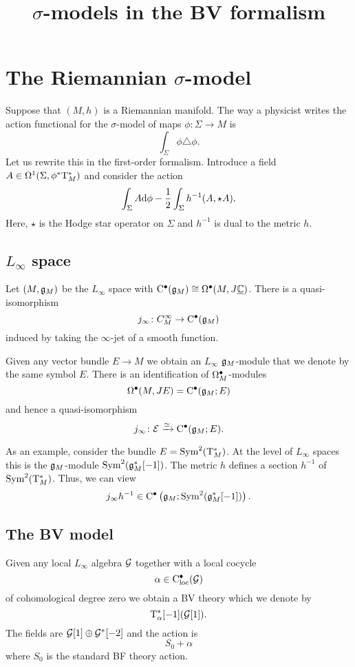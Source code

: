 \documentclass[11pt]{amsart}
\begin{document}
\title{$\sigma$-models in the BV formalism}
\maketitle

\section{The Riemannian $\sigma$-model} 

Suppose that $(M,h)$ is a Riemannian manifold. 
The way a physicist writes the action functional for the $\sigma$-model of maps $\phi \colon \Sigma \to M$ is
\[
\int_{\Sigma}  \phi \triangle \phi .
\]
Let us rewrite this in the first-order formalism. 
Introduce a field $A \in \Omega^1(\Sigma, \phi^* {\rm T}_M^*)$ and consider the action
\[
\int_{\Sigma} A {\rm d} \phi - \frac12 \int_\Sigma h^{-1} (A, \star A).
\]
Here, $\star$ is the Hodge star operator on $\Sigma$ and $h^{-1}$ is dual to the metric $h$.

\subsection{$L_\infty$ space}

Let $(M, \mathfrak g_M)$ be the $L_\infty$ space with ${\rm C}^\bullet(\mathfrak g_M) \cong \Omega^\bullet(M, J \smash{\underline{\mathbb C}})$. 
There is a quasi-isomorphism
\[
j_\infty \colon C^\infty_M \to {\rm C}^\bullet(\mathfrak g_M) 
\]
induced by taking the $\infty$-jet of a smooth function. 

Given any vector bundle $E \to M$ we obtain an $L_\infty$ $\mathfrak g_M$-module that we denote by the same symbol $E$. 
There is an identification of $\Omega^\bullet_M$-modules 
\[
\Omega^\bullet(M , J E) = {\rm C}^\bullet(\mathfrak g_M ; E) 
\]
and hence a quasi-isomorphism 
\[
j_\infty \colon \mathcal E \xrightarrow{\simeq} {\rm C}^\bullet(\mathfrak g_M ; E) .
\]

As an example, consider the bundle $E = {\rm Sym}^2 ({\rm T}^*_M)$. 
At the level of $L_\infty$ spaces this is the $\mathfrak g_M$-module $\operatorname{Sym}^2(\mathfrak g^*_M[-1])$. 
The metric $h$ defines a section $h^{-1}$ of ${\rm Sym}^2 ({\rm T}^*_M)$. 
Thus, we can view 
\[
j_\infty h^{-1} \in {\rm C}^\bullet\left(\mathfrak g_M ; \operatorname{Sym}^2(\mathfrak g^*_M[-1]) \right) .
\]

\subsection{The BV model} 

Given any local $L_\infty$ algebra $\mathcal G$ together with a local cocycle 
\[
\alpha \in {\rm C}_{\rm loc}^\bullet(\mathcal G) 
\]
of cohomological degree zero we obtain a BV theory which we denote by
\[
{\rm T}^*_\alpha [-1] (\mathcal G[1]) .
\]
The fields are $\mathcal G[1] \oplus \mathcal G^*[-2]$ and the action is 
\[
S_0 + \alpha
\]
where $S_0$ is the standard BF theory action. 
\end{document}
